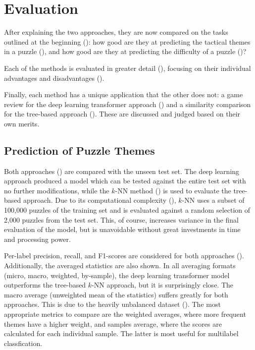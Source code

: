\chapter{Evaluation}\label{evalChapter}

After explaining the two approaches, they are now compared on the tasks
outlined at the beginning (): how good are they at
predicting the tactical themes in a puzzle (), and how good are
they at predicting the difficulty of a puzzle ()?

Each of the methods is evaluated in greater detail (),
focusing on their individual advantages and disadvantages
().

Finally, each method has a unique application that the other does not: a game
review for the deep learning transformer approach () and a
similarity comparison for the tree-based approach (). These are
discussed and judged based on their own merits.


\section{Prediction of Puzzle Themes}\label{evalS1}

Both approaches () are compared with the unseen
test set. The deep learning approach produced a model which can be tested
against the entire test set with no further modifications, while the $k$-NN
method () is used to evaluate the tree-based approach. Due to its
computational complexity (), $k$-NN uses a subset of 100,000
puzzles of the training set and is evaluated against a random selection of
2,000 puzzles from the test set. This, of course, increases variance in the
final evaluation of the model, but is unavoidable without great investments in
time and processing power.

Per-label precision, recall, and F1-scores are considered for both approaches
(). Additionally, the averaged statistics are also shown. In
all averaging formats (micro, macro, weighted, by-sample), the deep learning
transformer model outperforms the tree-based $k$-NN approach, but it is
surprisingly close. The macro average (unweighted mean of the statistics)
suffers greatly for both approaches. This is due to the heavily unbalanced
dataset (). The most appropriate metrics to compare are
the weighted averages, where more frequent themes have a higher weight, and
samples average, where the scores are calculated for each individual sample.
The latter is most useful for multilabel classfication.

